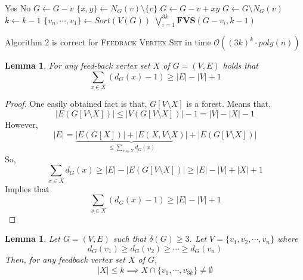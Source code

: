 \documentclass[12pt, a4paper, openany, twoside]{book}
\newtheorem{lem}[thm]{Lemma}
\theoremstyle{definition}
\theoremstyle{remark}
\newcommand{\CO}{{\mathcal {O}}} \newcommand{\CP}{{\mathcal {P}}}
\theoremstyle{plain}
\numberwithin{equation}{section}
\begin{document}
\begin{algorithm}
    
\caption{$\CO((3k)^k)$-time Algorithm for Feedback Vertex Set}

\begin{algorithmic}[1]
    \Return Yes
\EndIf
{}
    \Return No
\EndIf
{}
    \State $G \gets G - v$
    \State $\{x, y\} \gets N_G(v) \setminus \{v\}$
    \State $G \gets G - v + xy$ 
\Else    
    \State $G \gets G \setminus N_G(v)$
    \State $k \gets k - 1$ 
\EndIf 
\EndWhile
\State $\{v_n, \cdots, v_1\} \gets Sort(V(G))$ 
\State \Return $\bigvee_{i=1}^{3k} \mathbf{FVS}(G - v_i, k-1)$
\EndProcedure
\end{algorithmic}

\end{algorithm}

\begin{tcolorbox}[colback=yellow!10!white,colframe=green!75!black,title=Algorithm 2]

Algorithm 2 is correct for \textsc{Feedback Vertex Set} in time $\CO((3k)^k \cdot poly(n))$

\end{tcolorbox}

\begin{lem}
    
For any feed-back vertex set $X$ of $G = (V, E)$ holds that 
\[\sum_{x \in X} (d_G(x) - 1) \geq |E| - |V| + 1\]

\end{lem}

\begin{proof}
    
One easily obtained fact is that, $G[V \setminus X]$ is a forest. Means that, 
\[|E(G[V\setminus X])| \leq |V(G[V\setminus X])| - 1 = |V| - |X| - 1\]
However, 
\[|E| = \underbrace{|E(G[X])| + |E(X, V \setminus X)|}_{\leq \sum_{x \in X} d_G(x)} + |E(G[V \setminus X])|\]
So, 
\[\sum_{x \in X}d_G(x) \geq |E| - |E(G[V \setminus X])| \geq |E| - |V| + |X| + 1\]
Implies that 
\[\sum_{x \in X} (d_G(x) - 1) \geq |E| - |V| + 1\]

\end{proof}

\begin{lem}
    
Let $G = (V, E)$ such that $\delta(G) \geq 3$. Let $V = \{v_1, v_2, \cdots, v_n\}$ where 
\[d_G(v_1) \geq d_G(v_2) \geq \cdots \geq d_G(v_n)\]
Then, for any feedback vertex set $X$ of $G$, 
\[|X| \leq k \implies X \cap \{v_1, \cdots, v_{3k}\} \neq \emptyset\]

\end{lem}
\end{document}
